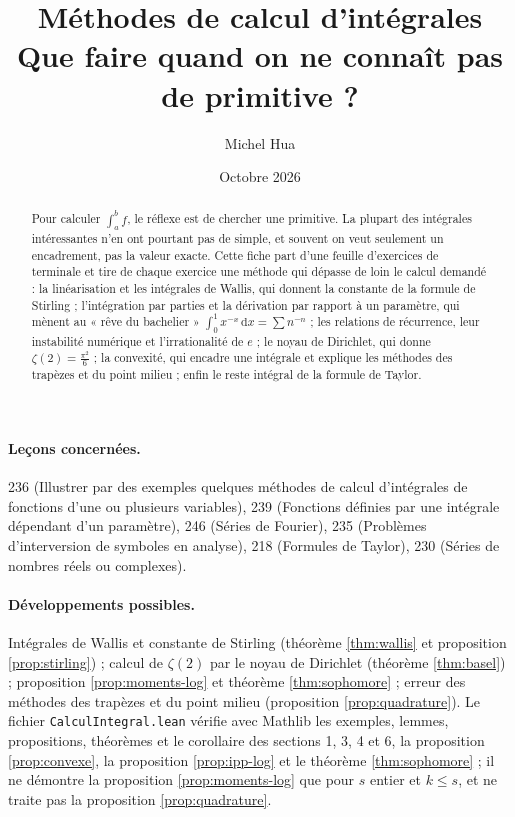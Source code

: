 \documentclass[11pt,a4paper]{article}
\title{Méthodes de calcul d'intégrales\\[2pt]
\large Que faire quand on ne connaît pas de primitive ?}
\author{Michel Hua}
\date{Octobre 2026}
\theoremstyle{plain}
\theoremstyle{definition}
\theoremstyle{remark}
\newcommand{\dd}{\,\mathrm{d}}
\begin{document}
\maketitle

\begin{abstract}
Pour calculer $\int_a^bf$, le réflexe est de chercher une primitive. La plupart des intégrales intéressantes n'en ont pourtant pas de simple, et souvent on veut seulement un encadrement, pas la valeur exacte. Cette fiche part d'une feuille d'exercices de terminale et tire de chaque exercice une méthode qui dépasse de loin le calcul demandé : la linéarisation et les intégrales de Wallis, qui donnent la constante de la formule de Stirling ; l'intégration par parties et la dérivation par rapport à un paramètre, qui mènent au « rêve du bachelier » $\int_0^1x^{-x}\dd x=\sum n^{-n}$ ; les relations de récurrence, leur instabilité numérique et l'irrationalité de $e$ ; le noyau de Dirichlet, qui donne $\zeta(2)=\frac{\pi^2}6$ ; la convexité, qui encadre une intégrale et explique les méthodes des trapèzes et du point milieu ; enfin le reste intégral de la formule de Taylor.
\end{abstract}

\paragraph{Leçons concernées.} 236 (Illustrer par des exemples quelques méthodes de calcul d'intégrales de fonctions d'une ou plusieurs variables), 239 (Fonctions définies par une intégrale dépendant d'un paramètre), 246 (Séries de Fourier), 235 (Problèmes d'interversion de symboles en analyse), 218 (Formules de Taylor), 230 (Séries de nombres réels ou complexes).

\paragraph{Développements possibles.} Intégrales de Wallis et constante de Stirling (théorème \ref{thm:wallis} et proposition \ref{prop:stirling}) ; calcul de $\zeta(2)$ par le noyau de Dirichlet (théorème \ref{thm:basel}) ; proposition \ref{prop:moments-log} et théorème \ref{thm:sophomore} ; erreur des méthodes des trapèzes et du point milieu (proposition \ref{prop:quadrature}). Le fichier \texttt{CalculIntegral.lean} vérifie avec Mathlib les exemples, lemmes, propositions, théorèmes et le corollaire des sections 1, 3, 4 et 6, la proposition \ref{prop:convexe}, la proposition \ref{prop:ipp-log} et le théorème \ref{thm:sophomore} ; il ne démontre la proposition \ref{prop:moments-log} que pour $s$ entier et $k\leq s$, et ne traite pas la proposition \ref{prop:quadrature}.
\end{document}
